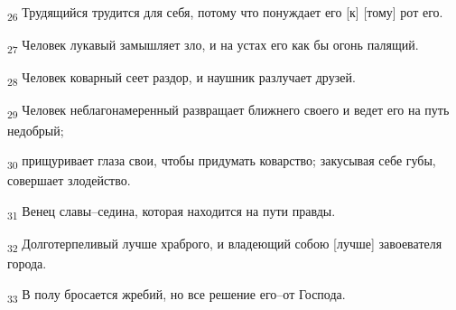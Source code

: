 \begin{tcolorbox}
\textsubscript{26} Трудящийся трудится для себя, потому что понуждает его [к] [тому] рот его.
\end{tcolorbox}
\begin{tcolorbox}
\textsubscript{27} Человек лукавый замышляет зло, и на устах его как бы огонь палящий.
\end{tcolorbox}
\begin{tcolorbox}
\textsubscript{28} Человек коварный сеет раздор, и наушник разлучает друзей.
\end{tcolorbox}
\begin{tcolorbox}
\textsubscript{29} Человек неблагонамеренный развращает ближнего своего и ведет его на путь недобрый;
\end{tcolorbox}
\begin{tcolorbox}
\textsubscript{30} прищуривает глаза свои, чтобы придумать коварство; закусывая себе губы, совершает злодейство.
\end{tcolorbox}
\begin{tcolorbox}
\textsubscript{31} Венец славы--седина, которая находится на пути правды.
\end{tcolorbox}
\begin{tcolorbox}
\textsubscript{32} Долготерпеливый лучше храброго, и владеющий собою [лучше] завоевателя города.
\end{tcolorbox}
\begin{tcolorbox}
\textsubscript{33} В полу бросается жребий, но все решение его--от Господа.
\end{tcolorbox}
